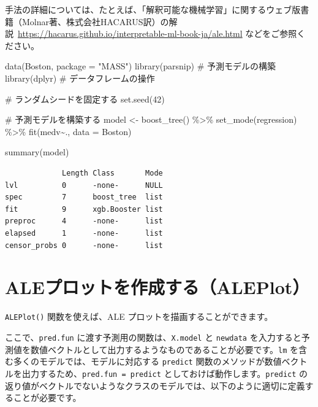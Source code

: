 \documentclass[
  letterpaper,
  DIV=11,
  numbers=noendperiod]{scrreprt}
\newenvironment{Shaded}{\begin{snugshade}}{\end{snugshade}}
\newcommand{\AttributeTok}[1]{\textcolor[rgb]{0.40,0.45,0.13}{#1}}
\newcommand{\CommentTok}[1]{\textcolor[rgb]{0.37,0.37,0.37}{#1}}
\newcommand{\DecValTok}[1]{\textcolor[rgb]{0.68,0.00,0.00}{#1}}
\newcommand{\FunctionTok}[1]{\textcolor[rgb]{0.28,0.35,0.67}{#1}}
\newcommand{\NormalTok}[1]{\textcolor[rgb]{0.00,0.23,0.31}{#1}}
\newcommand{\OtherTok}[1]{\textcolor[rgb]{0.00,0.23,0.31}{#1}}
\newcommand{\SpecialCharTok}[1]{\textcolor[rgb]{0.37,0.37,0.37}{#1}}
\newcommand{\StringTok}[1]{\textcolor[rgb]{0.13,0.47,0.30}{#1}}
\begin{document}
手法の詳細については、たとえば、「解釈可能な機械学習」に関するウェブ版書籍（Molnar著、株式会社HACARUS訳）の解説~\hyperref[0]{https://hacarus.github.io/interpretable-ml-book-ja/ale.html}
などをご参照ください。

\begin{Shaded}
\begin{Highlighting}[]
\FunctionTok{data}\NormalTok{(Boston, }\AttributeTok{package =} \StringTok{"MASS"}\NormalTok{)}
\FunctionTok{library}\NormalTok{(parsnip) }\CommentTok{\# 予測モデルの構築}
\FunctionTok{library}\NormalTok{(dplyr) }\CommentTok{\# データフレームの操作}

\CommentTok{\# ランダムシードを固定する}
\FunctionTok{set.seed}\NormalTok{(}\DecValTok{42}\NormalTok{)}

\CommentTok{\# 予測モデルを構築する}
\NormalTok{model }\OtherTok{\textless{}{-}} \FunctionTok{boost\_tree}\NormalTok{() }\SpecialCharTok{\%\textgreater{}\%}
  \FunctionTok{set\_mode}\NormalTok{(}\StringTok{\textquotesingle{}regression\textquotesingle{}}\NormalTok{) }\SpecialCharTok{\%\textgreater{}\%}
  \FunctionTok{fit}\NormalTok{(medv}\SpecialCharTok{\textasciitilde{}}\NormalTok{., }\AttributeTok{data =}\NormalTok{ Boston)}

\FunctionTok{summary}\NormalTok{(model)}
\end{Highlighting}
\end{Shaded}

\begin{verbatim}
             Length Class       Mode
lvl          0      -none-      NULL
spec         7      boost_tree  list
fit          9      xgb.Booster list
preproc      4      -none-      list
elapsed      1      -none-      list
censor_probs 0      -none-      list
\end{verbatim}

\section{ALEプロットを作成する（ALEPlot）}\label{aleux30d7ux30edux30c3ux30c8ux3092ux4f5cux6210ux3059ux308baleplot}

\texttt{ALEPlot()} 関数を使えば、ALE プロットを描画することができます。

ここで、\texttt{pred.fun} に渡す予測用の関数は、\texttt{X.model} と
\texttt{newdata}
を入力すると予測値を数値ベクトルとして出力するようなものであることが必要です。\texttt{lm}
を含む多くのモデルでは、モデルに対応する \texttt{predict}
関数のメソッドが数値ベクトルを出力するため、\texttt{pred.fun\ =\ predict}
としておけば動作します。\texttt{predict}
の返り値がベクトルでないようなクラスのモデルでは、以下のように適切に定義することが必要です。
\end{document}
